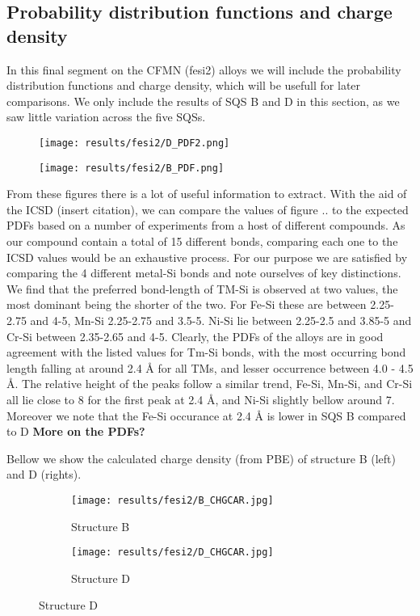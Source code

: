\subsection{Probability distribution functions and charge density}

In this final segment on the CFMN (fesi2) alloys we will include the probability distribution functions and charge density, which will be usefull for later comparisons. We only include the results of SQS B and D in this section, as we saw little variation across the five SQSs.   
 
\begin{figure}[H]
	\centering
	\texttt{[image: results/fesi2/D\_PDF2.png]}
\end{figure}

\begin{figure}[H]
	\centering
	\texttt{[image: results/fesi2/B\_PDF.png]}
\end{figure}

From these figures there is a lot of useful information to extract. With the aid of the ICSD (insert citation), we can compare the values of figure .. to the expected PDFs based on a number of experiments from a host of different compounds. As our compound contain a total of 15 different bonds, comparing each one to the ICSD values would be an exhaustive process. For our purpose we are satisfied by comparing the 4 different metal-Si bonds and note ourselves of key distinctions. We find that the preferred bond-length of TM-Si is observed at two values, the most dominant being the shorter of the two. For Fe-Si these are between 2.25-2.75 and 4-5, Mn-Si 2.25-2.75 and 3.5-5. Ni-Si lie between 2.25-2.5 and 3.85-5 and Cr-Si between 2.35-2.65 and 4-5.
Clearly, the PDFs of the alloys are in good agreement with the listed values for Tm-Si bonds, with the most occurring bond length falling at around 2.4 Å for all TMs, and lesser occurrence between 4.0 - 4.5 Å. The relative height of the peaks follow a similar trend, Fe-Si, Mn-Si, and Cr-Si all lie close to 8 for the first peak at 2.4 Å, and Ni-Si slightly bellow around 7. Moreover we note that the Fe-Si occurance at 2.4 Å is lower in SQS B compared to D \textbf{More on the PDFs?}

Bellow we show the calculated charge density (from PBE) of structure B (left) and D (rights).
\begin{figure}[H]
	\begin{subfigure}{.5\textwidth}
		\texttt{[image: results/fesi2/B\_CHGCAR.jpg]}
		\caption{Structure B}
	\end{subfigure}
	\hfill
	\begin{subfigure}{.5\textwidth}
		\texttt{[image: results/fesi2/D\_CHGCAR.jpg]}
		\caption{Structure D}
	\end{subfigure}
\end{figure}

